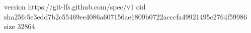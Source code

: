 version https://git-lfs.github.com/spec/v1
oid sha256:5e3edd7b2c55469ee4086a607156ae1809b0722acccfa49921495c2764f59986
size 32864
